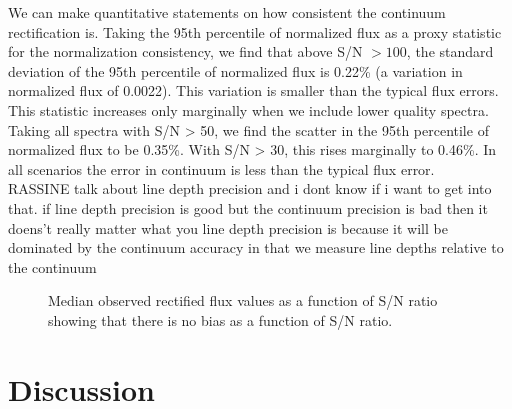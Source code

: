 \documentclass[modern]{aastex631}
\newcommand{\todo}[1]{\textcolor{tab:red}{#1}}
\begin{document}
We can make quantitative statements on how consistent the continuum rectification is. Taking the 95th percentile of normalized flux as a proxy statistic for the normalization consistency, we find that above S/N $> 100$, the standard deviation of the 95th percentile of normalized flux is 0.22\% (a variation in normalized flux of 0.0022). This variation is smaller than the typical flux errors. This statistic increases only marginally when we include lower quality spectra. Taking all spectra with S/N > 50, we find the scatter in the 95th percentile of normalized flux to be 0.35\%. With S/N > 30, this rises marginally to 0.46\%. \todo{In all scenarios the error in continuum is less than the typical flux error.}\\








\todo{RASSINE talk about line depth precision and i dont know if i want to get into that. if line depth precision is good but the continuum precision is bad then it doens't really matter what you line depth precision is because it will be dominated by the continuum accuracy in that we measure line depths relative to the continuum}

\begin{figure}
    \caption{Median observed rectified flux values as a function of S/N ratio showing that there is no bias as a function of S/N ratio.}
\end{figure}


\section{Discussion}\label{sec:discussion}
\end{document}
